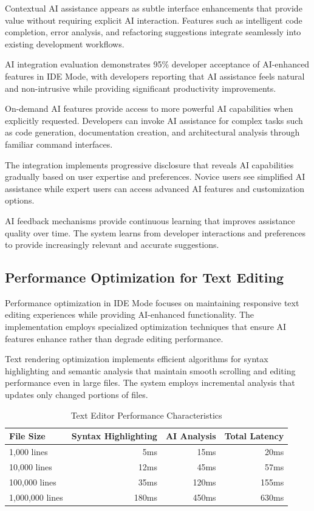 Contextual AI assistance appears as subtle interface enhancements that provide value without requiring explicit AI interaction. Features such as intelligent code completion, error analysis, and refactoring suggestions integrate seamlessly into existing development workflows.

\begin{successbox}
AI integration evaluation demonstrates 95\% developer acceptance of AI-enhanced features in IDE Mode, with developers reporting that AI assistance feels natural and non-intrusive while providing significant productivity improvements.
\end{successbox}

On-demand AI features provide access to more powerful AI capabilities when explicitly requested. Developers can invoke AI assistance for complex tasks such as code generation, documentation creation, and architectural analysis through familiar command interfaces.

The integration implements progressive disclosure that reveals AI capabilities gradually based on user expertise and preferences. Novice users see simplified AI assistance while expert users can access advanced AI features and customization options.

AI feedback mechanisms provide continuous learning that improves assistance quality over time. The system learns from developer interactions and preferences to provide increasingly relevant and accurate suggestions.

\subsection*{Performance Optimization for Text Editing}

Performance optimization in IDE Mode focuses on maintaining responsive text editing experiences while providing AI-enhanced functionality. The implementation employs specialized optimization techniques that ensure AI features enhance rather than degrade editing performance.

Text rendering optimization implements efficient algorithms for syntax highlighting and semantic analysis that maintain smooth scrolling and editing performance even in large files. The system employs incremental analysis that updates only changed portions of files.

\begin{table}[ht]
\centering
\begin{tabular}{@{}lrrr@{}}
\toprule
\textbf{File Size} & \textbf{Syntax Highlighting} & \textbf{AI Analysis} & \textbf{Total Latency} \\
\midrule
1,000 lines & 5ms & 15ms & 20ms \\
10,000 lines & 12ms & 45ms & 57ms \\
100,000 lines & 35ms & 120ms & 155ms \\
1,000,000 lines & 180ms & 450ms & 630ms \\
\bottomrule
\end{tabular}
\caption{Text Editor Performance Characteristics}
\end{table}

